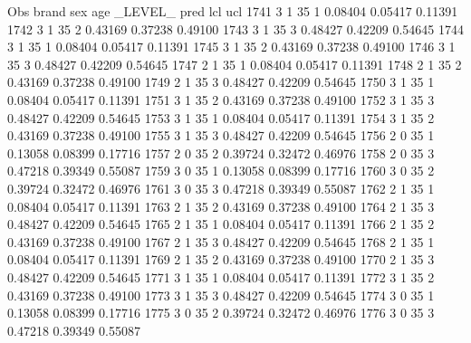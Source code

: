 \documentclass{article}
\begin{document}
\begin{Woutput}
 Obs    brand    sex    age    _LEVEL_      pred       lcl        ucl
1741      3       1      35       1       0.08404    0.05417    0.11391
1742      3       1      35       2       0.43169    0.37238    0.49100
1743      3       1      35       3       0.48427    0.42209    0.54645
1744      3       1      35       1       0.08404    0.05417    0.11391
1745      3       1      35       2       0.43169    0.37238    0.49100
1746      3       1      35       3       0.48427    0.42209    0.54645
1747      2       1      35       1       0.08404    0.05417    0.11391
1748      2       1      35       2       0.43169    0.37238    0.49100
1749      2       1      35       3       0.48427    0.42209    0.54645
1750      3       1      35       1       0.08404    0.05417    0.11391
1751      3       1      35       2       0.43169    0.37238    0.49100
1752      3       1      35       3       0.48427    0.42209    0.54645
1753      3       1      35       1       0.08404    0.05417    0.11391
1754      3       1      35       2       0.43169    0.37238    0.49100
1755      3       1      35       3       0.48427    0.42209    0.54645
1756      2       0      35       1       0.13058    0.08399    0.17716
1757      2       0      35       2       0.39724    0.32472    0.46976
1758      2       0      35       3       0.47218    0.39349    0.55087
1759      3       0      35       1       0.13058    0.08399    0.17716
1760      3       0      35       2       0.39724    0.32472    0.46976
1761      3       0      35       3       0.47218    0.39349    0.55087
1762      2       1      35       1       0.08404    0.05417    0.11391
1763      2       1      35       2       0.43169    0.37238    0.49100
1764      2       1      35       3       0.48427    0.42209    0.54645
1765      2       1      35       1       0.08404    0.05417    0.11391
1766      2       1      35       2       0.43169    0.37238    0.49100
1767      2       1      35       3       0.48427    0.42209    0.54645
1768      2       1      35       1       0.08404    0.05417    0.11391
1769      2       1      35       2       0.43169    0.37238    0.49100
1770      2       1      35       3       0.48427    0.42209    0.54645
1771      3       1      35       1       0.08404    0.05417    0.11391
1772      3       1      35       2       0.43169    0.37238    0.49100
1773      3       1      35       3       0.48427    0.42209    0.54645
1774      3       0      35       1       0.13058    0.08399    0.17716
1775      3       0      35       2       0.39724    0.32472    0.46976
1776      3       0      35       3       0.47218    0.39349    0.55087

\end{Woutput}
\end{document}
